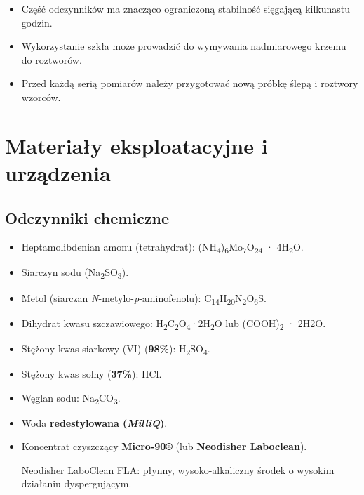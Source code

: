 \documentclass[
  letterpaper,
  DIV=11,
  numbers=noendperiod]{scrreprt}
\begin{document}
\begin{tcolorbox}[enhanced jigsaw, toptitle=1mm, bottomtitle=1mm, opacitybacktitle=0.6, colframe=quarto-callout-important-color-frame, bottomrule=.15mm, title=\textcolor{quarto-callout-important-color}{\faExclamation}\hspace{0.5em}{Uwaga}, colbacktitle=quarto-callout-important-color!10!white, left=2mm, breakable, rightrule=.15mm, colback=white, opacityback=0, arc=.35mm, coltitle=black, leftrule=.75mm, toprule=.15mm, titlerule=0mm]

\begin{itemize}
\item
  Część odczynników ma znacząco ograniczoną stabilność sięgającą
  kilkunastu godzin.
\item
  Wykorzystanie szkła może prowadzić do wymywania nadmiarowego krzemu do
  roztworów.
\item
  Przed każdą serią pomiarów należy przygotować nową próbkę ślepą i
  roztwory wzorców.
\end{itemize}

\end{tcolorbox}

\hypertarget{materiaux142y-eksploatacyjne-i-urzux105dzenia}{%
\section{Materiały eksploatacyjne i
urządzenia}\label{materiaux142y-eksploatacyjne-i-urzux105dzenia}}

\hypertarget{odczynniki-chemiczne}{%
\subsection{Odczynniki chemiczne}\label{odczynniki-chemiczne}}

\begin{itemize}
\item
  Heptamolibdenian amonu (tetrahydrat):
  (NH\textsubscript{4})\textsubscript{6}Mo\textsubscript{7}O\textsubscript{24}
  · 4H\textsubscript{2}O.
\item
  Siarczyn sodu (Na\textsubscript{2}SO\textsubscript{3}).
\item
  Metol (siarczan \emph{N}-metylo-\emph{p}-aminofenolu):
  C\textsubscript{14}H\textsubscript{20}N\textsubscript{2}O\textsubscript{6}S.
\item
  Dihydrat kwasu szczawiowego:
  H\textsubscript{2}C\textsubscript{2}O\textsubscript{4}·2H\textsubscript{2}O
  lub (COOH)\textsubscript{2} · 2H2O.
\item
  Stężony kwas siarkowy (VI) (\textbf{98\%}):
  H\textsubscript{2}SO\textsubscript{4}.
\item
  Stężony kwas solny (\textbf{37\%}): HCl.
\item
  Węglan sodu: Na\textsubscript{2}CO\textsubscript{3}.
\item
  Woda \textbf{redestylowana (\emph{MilliQ})}.
\item
  Koncentrat czyszczący \textbf{Micro-90®} (lub \textbf{Neodisher
  Laboclean}).

  Neodisher LaboClean FLA: płynny, wysoko-alkaliczny środek o wysokim
  działaniu dyspergującym.
\end{itemize}
\end{document}
